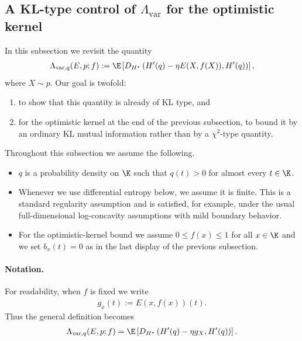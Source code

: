 \subsection{A KL-type control of $\Lambda_{\mathrm{var}}$ for the optimistic kernel}

In this subsection we revisit the quantity
\begin{align*}
    \Lambda_{\mathrm{var}, q}(E, p; f)
     :=
    \E\left[
        D_{H^\star}\left(
        H'(q) - \eta E(X, f(X)), H'(q)
        \right)
        \right],
\end{align*}
where $X \sim p$.
Our goal is twofold:
\begin{enumerate}
    \item to show that this quantity is already of KL type, and
    \item for the optimistic kernel at the end of the previous subsection, to bound it by an ordinary KL mutual information rather than by a $\chi^2$-type quantity.
\end{enumerate}

Throughout this subsection we assume the following.
\begin{itemize}
    \item $q$ is a probability density on $\K$ such that $q(t) > 0$ for almost every $t \in \K$.
    \item Whenever we use differential entropy below, we assume it is finite. This is a standard regularity assumption and is satisfied, for example, under the usual full-dimensional log-concavity assumptions with mild boundary behavior.
    \item For the optimistic-kernel bound we assume $0 \leq f(x) \leq 1$ for all $x \in \K$ and we set $b_x(t) = 0$ as in the last display of the previous subsection.
\end{itemize}

\paragraph{Notation.}
For readability, when $f$ is fixed we write
\begin{align}
    g_x(t) := E(x, f(x))(t).
    \label{eq:appendix_gx_def}
\end{align}
Thus the general definition becomes
\begin{align}
    \Lambda_{\mathrm{var}, q}(E, p; f)
    =
    \E\left[
        D_{H^\star}\left(
        H'(q) - \eta g_X, H'(q)
        \right)
    \right].
    \label{eq:appendix_lambda_var_general_def}
\end{align}

